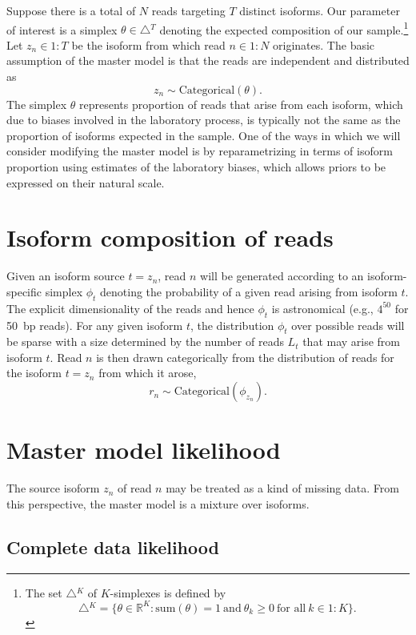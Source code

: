 \documentclass[11pt]{report}
\newcommand{\rngto}[1]{1{:}#1}
\newcommand{\rdistro}[2]{\textrm{#1}\!\left( #2 \right)}
\begin{document}
Suppose there is a total of $N$ reads targeting $T$ distinct isoforms.
Our parameter of interest is a simplex $\theta \in \bigtriangleup\!^T$
denoting the expected composition of our sample.\footnote{The set
  $\bigtriangleup\!^K$ of $K$-simplexes is defined by
  \[
    \bigtriangleup\!^K
    = \{ \theta \in \mathbb{R}^K : 
    \textrm{sum}(\theta) = 1
    \ \textrm{and} \
    \theta_k \geq 0 \ \textrm{for all} \ k \in \rngto{K}
    \}.
  \]
}
Let
$z_n \in \rngto{T}$ be the isoform from which read $n \in \rngto{N}$
originates. The basic assumption of the master model is that the reads
are independent and distributed as
\[
  z_n \sim \rdistro{Categorical}{\theta}.
\]
The simplex $\theta$ represents proportion of reads that arise from
each isoform, which due to biases involved in the laboratory process,
is typically not the same as the proportion of isoforms expected in
the sample.  One of the ways in which we will consider modifying the
master model is by reparametrizing in terms of isoform proportion
using estimates of the laboratory biases, which allows priors to be
expressed on their natural scale.

\section{Isoform composition of reads}

Given an isoform source $t = z_n$, read $n$ will be generated according to
an isoform-specific simplex $\phi_t$ denoting the probability of a
given read arising from isoform $t$.  The explicit dimensionality of
the reads and hence $\phi_t$ is astronomical (e.g., $4^{50}$ for 50~bp
reads).  For any given isoform $t$, the distribution $\phi_t$ over
possible reads will be sparse with a size determined by the number of
reads $L_t$ that may arise from isoform $t$.  Read $n$ is then drawn
categorically from the distribution of reads for the isoform $t = z_n$
from which it arose,
\[
  r_n \sim \rdistro{Categorical}{\phi_{z_n}}. 
\]

\section{Master model likelihood}

The source isoform $z_n$ of read $n$ may be treated as a kind of
missing data.  From this perspective, the master model is a mixture over
isoforms.  

\subsection{Complete data likelihood}
\end{document}
